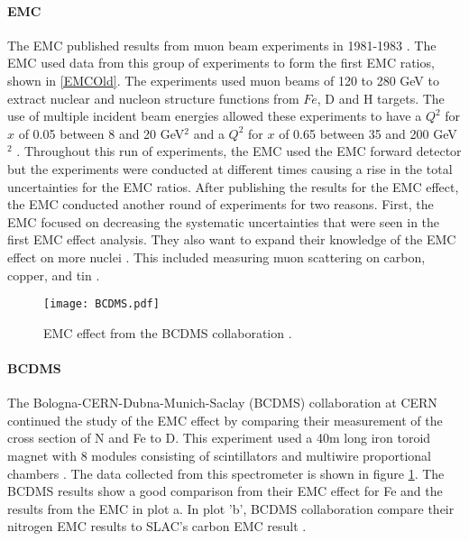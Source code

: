 \paragraph{EMC} The EMC published results from muon beam experiments in 1981-1983 \cite{EMC_iron,EM,EMC_F2d,CERN_EMC}.  The EMC used data from this group of experiments to form the first EMC ratios, shown in \ref{EMCOld}. The experiments used muon beams of 120 to 280 GeV to extract nuclear and nucleon structure functions from $Fe$, D and H targets. The use of multiple incident beam energies allowed these experiments to have a $Q^2$ for $x$ of 0.05 between 8 and 20 GeV$^2$ and a $Q^2$ for $x$ of 0.65 between 35 and 200 GeV$^2$ \cite{CERN_EMC}. Throughout this run of experiments, the EMC used the EMC forward detector but the experiments were conducted at different times causing a rise in the total uncertainties for the EMC ratios\cite{EM}. After publishing the results for the EMC effect, the EMC conducted another round of experiments for two reasons. First, the EMC focused on decreasing the systematic uncertainties that were seen in the first EMC effect analysis. They also want to expand their knowledge of the EMC effect on more nuclei \cite{EMC_ext, Ajth}. This included measuring muon scattering on carbon, copper, and tin \cite{EMC_ext}.

\begin{figure}[t]
	\centering
	\texttt{[image: BCDMS.pdf]}
		\caption{EMC effect from the BCDMS collaboration \cite{BCDMS}. }
	\label{fig:BCDMS}
\end{figure}
\paragraph{BCDMS}The Bologna-CERN-Dubna-Munich-Saclay (BCDMS) collaboration at CERN continued the study of the EMC effect by comparing their measurement of the cross section of N and Fe to D. This experiment used a 40m long iron toroid magnet with 8 modules consisting of scintillators and multiwire proportional chambers \cite{BCDMS}. The data collected from this spectrometer is shown in figure \ref{fig:BCDMS}. The BCDMS results show a good comparison from their EMC effect for Fe and the results from the EMC in plot a. In plot 'b', BCDMS collaboration compare their nitrogen EMC results to SLAC's carbon EMC result \cite{BCDMS,Norton}.


